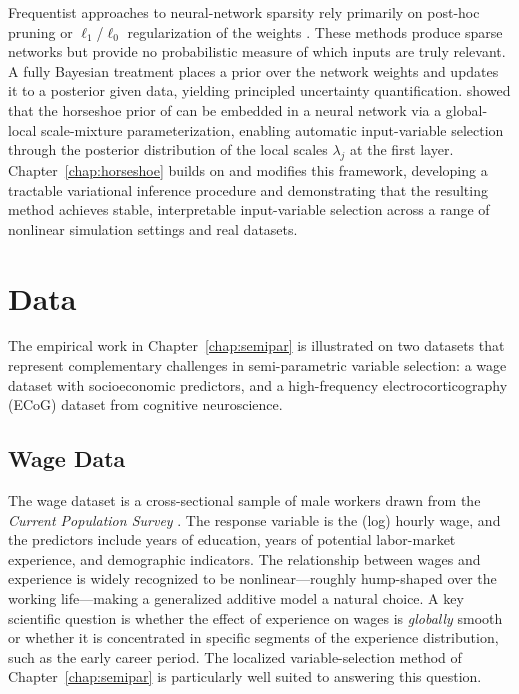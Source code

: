 Frequentist approaches to neural-network sparsity rely primarily on
post-hoc pruning or $\ell_1$/$\ell_0$ regularization of the weights
\citep{lecun1990obd, han2015pruning}. These methods produce sparse
networks but provide no probabilistic measure of which inputs are truly
relevant. A fully Bayesian treatment places a prior over the network
weights and updates it to a posterior given data, yielding principled
uncertainty quantification. \citet{louizos2017bayesian} showed that the
horseshoe prior of \citet{carvalho2010horseshoe} can be embedded in a
neural network via a global-local scale-mixture parameterization,
enabling automatic input-variable selection through the posterior
distribution of the local scales $\lambda_j$ at the first layer.
Chapter~\ref{chap:horseshoe} builds on and modifies this framework,
developing a tractable variational inference procedure and demonstrating
that the resulting method achieves stable, interpretable input-variable
selection across a range of nonlinear simulation settings and real
datasets.

\section{Data}
\label{sec:intro-data}

The empirical work in Chapter~\ref{chap:semipar} is illustrated on two
datasets that represent complementary challenges in semi-parametric
variable selection: a wage dataset with socioeconomic predictors, and a
high-frequency electrocorticography (ECoG) dataset from cognitive
neuroscience.

\subsection{Wage Data}
\label{subsec:data-wages}

The wage dataset is a cross-sectional sample of male workers drawn from
the \emph{Current Population Survey} \citep{murphy1990empirical}. The
response variable is the (log) hourly wage, and the predictors include
years of education, years of potential labor-market experience, and
demographic indicators. The relationship between wages and experience is
widely recognized to be nonlinear---roughly hump-shaped over the working
life---making a generalized additive model a natural choice. A key
scientific question is whether the effect of experience on wages is
\emph{globally} smooth or whether it is concentrated in specific
segments of the experience distribution, such as the early career
period. The localized variable-selection method of
Chapter~\ref{chap:semipar} is particularly well suited to answering
this question.

